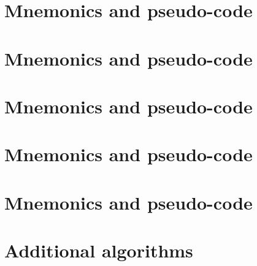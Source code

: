 \documentclass[preprint]{iacrtrans}
\begin{document}

\appendix

\newpage
\section{ Mnemonics and pseudo-code}
\label{sec:pseudo:v1}

\newpage
\section{ Mnemonics and pseudo-code}
\label{sec:pseudo:v2}

\newpage
\section{ Mnemonics and pseudo-code}
\label{sec:pseudo:v3}

\newpage
\section{ Mnemonics and pseudo-code}
\label{sec:pseudo:v4}

\newpage
\section{ Mnemonics and pseudo-code}
\label{sec:pseudo:v5}


\newpage
\section{Additional algorithms}
\label{sec:alg}


\end{document}
